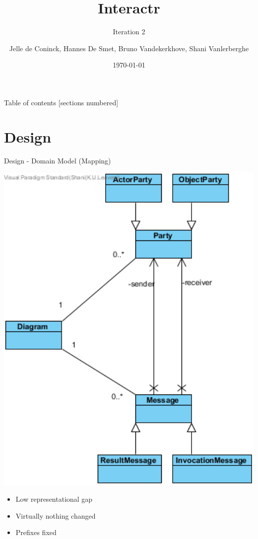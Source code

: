 \documentclass[10pt]{beamer}
\title{Interactr}
\subtitle{Iteration 2}
\date{\today}
\author{Jelle de Coninck, Hannes De Smet, Bruno Vandekerkhove, Shani Vanlerberghe}
\institute{KULeuven}
\begin{document}
\maketitle

\begin{frame}{Table of contents}
  [sections numbered]
  \tableofcontents[hideallsubsections]
\end{frame}

\section{Design}

\begin{frame}[fragile]{Design - Domain Model (Mapping)}
\noindent\begin{minipage}{0.5\textwidth}%
\includegraphics[width=1\textwidth]{domain}
\end{minipage}%
\hfill%
\begin{minipage}{0.5\textwidth}\raggedleft
\begin{itemize}
	\item Low representational gap
	\item Virtually nothing changed
	\item Prefixes fixed
	\end{itemize}
\end{minipage}
\end{frame}
\end{document}
